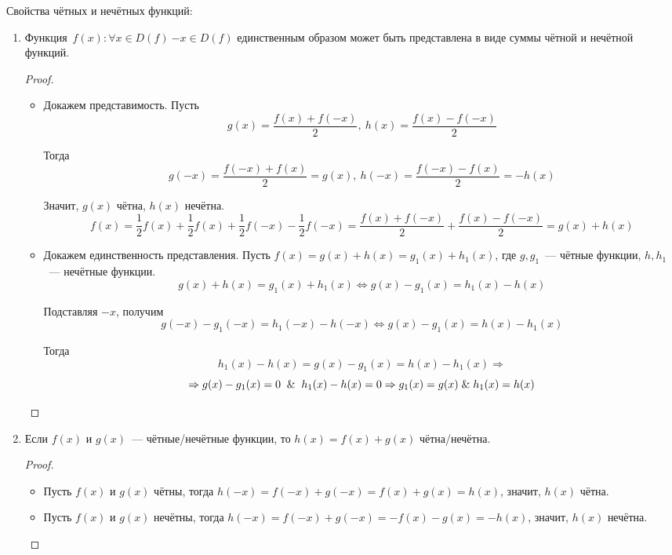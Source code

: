 Свойства чётных и нечётных функций:
\begin{enumerate}
	\item Функция~$f(x) \colon \forall x \in D(f) \ {-x} \in D(f)$ единственным образом может быть представлена в виде суммы чётной и нечётной функций.
	\begin{proof}
	\begin{itemize}
		\item Докажем представимость.
		Пусть
		\begin{equation*}
		g(x) = \frac{f(x) + f(-x)}2, \ h(x) = \frac{f(x) - f(-x)}2
		\end{equation*}
		
		Тогда
		\begin{equation*}
		g(-x) = \frac{f(-x) + f(x)}2 = g(x), \ h(-x) = \frac{f(-x) - f(x)}2 = -h(x)
		\end{equation*}
		
		Значит, $g(x)$ чётна, $h(x)$ нечётна.
		\begin{equation*}
		f(x) = \frac12 f(x) + \frac12 f(x) + \frac12 f(-x) - \frac12 f(-x) =
		\frac{f(x) + f(-x)}2 + \frac{f(x) - f(-x)}2 =
		g(x) + h(x)
		\end{equation*}
		
		\item Докажем единственность представления.
		Пусть $f(x) = g(x) + h(x) = g_1(x) + h_1(x)$, где $g, g_1$~--- чётные функции, $h, h_1$~--- нечётные функции.
		\begin{equation*}
		g(x) + h(x) = g_1(x) + h_1(x) \Leftrightarrow
		g(x) - g_1(x) = h_1(x) - h(x)
		\end{equation*}
		
		Подставляя $-x$, получим
		\begin{equation*}
		g(-x) - g_1(-x) = h_1(-x) - h(-x) \Leftrightarrow
		g(x) - g_1(x) = h(x) - h_1(x)
		\end{equation*}
		
		Тогда
		\begin{equation*}
		h_1(x) - h(x) = g(x) - g_1(x) = h(x) - h_1(x) \Rightarrow
		\end{equation*}
		\begin{equation*}
		\Rightarrow g(x) - g_1(x) = 0 \And h_1(x) - h(x) = 0 \Rightarrow
		g_1(x) = g(x) \lAnd h_1(x) = h(x)
		\end{equation*}
	\end{itemize}
	\end{proof}
	
	\item Если $f(x)$ и $g(x)$~--- чётные/нечётные функции, то $h(x) = f(x) + g(x)$ чётна/нечётна.
	\begin{proof}
	\begin{itemize}
		\item Пусть $f(x)$ и $g(x)$ чётны, тогда $h(-x) = f(-x) + g(-x) = f(x) + g(x) = h(x)$, значит, $h(x)$ чётна.
		\item Пусть $f(x)$ и $g(x)$ нечётны, тогда $h(-x) = f(-x) + g(-x) = -f(x) - g(x) = -h(x)$, значит, $h(x)$ нечётна.
	\end{itemize}
	\end{proof}
	

\end{enumerate}

